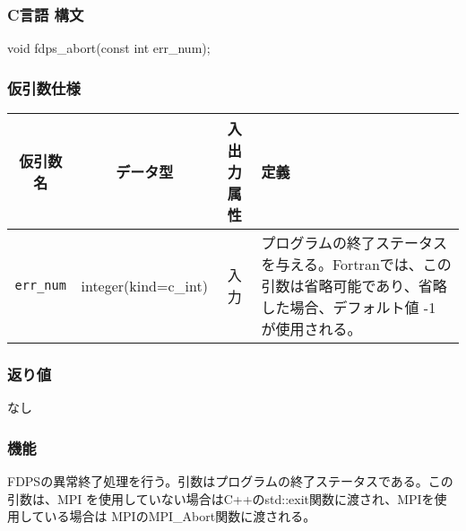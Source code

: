 \subsubsection*{C言語 構文}
\begin{screen}
\begin{spverbatim}
void fdps_abort(const int err_num);
\end{spverbatim}
\end{screen}

\subsubsection*{仮引数仕様}
\begin{table}[h]
\begin{tabularx}{\linewidth}{cccX}
\toprule
\rowcolor{Snow2}
仮引数名 & データ型 & 入出力属性 & 定義 \\
\midrule
\texttt{err\_num} & integer(kind=c\_int) & 入力 & プログラムの終了ステータスを与える。Fortranでは、この引数は省略可能であり、省略した場合、デフォルト値 -1 が使用される。\\
\bottomrule
\end{tabularx}
\end{table}

\subsubsection*{返り値}
なし

\subsubsection*{機能}
FDPSの異常終了処理を行う。引数はプログラムの終了ステータスである。この引数は、MPI を使用していない場合はC++のstd::exit関数に渡され、MPIを使用している場合は MPIのMPI\_Abort関数に渡される。
\clearpage
